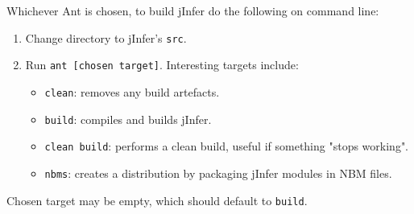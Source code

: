 \documentclass[a4paper,10pt,oneside]{article}
\begin{document}
Whichever Ant is chosen, to build jInfer do the following on command line:
\begin{enumerate}
	\item Change directory to jInfer's \texttt{src}.
	\item Run \texttt{ant [chosen target]}. Interesting targets include:
	\begin{itemize}
		\item \texttt{clean}: removes any build artefacts.
		\item \texttt{build}: compiles and builds jInfer.
		\item \texttt{clean build}: performs a clean build, useful if something "stops working".
		\item \texttt{nbms}: creates a distribution by packaging jInfer modules in NBM files.
	\end{itemize}
\end{enumerate}

Chosen target may be empty, which should default to \texttt{build}.

\nocite{*}


\end{document}
